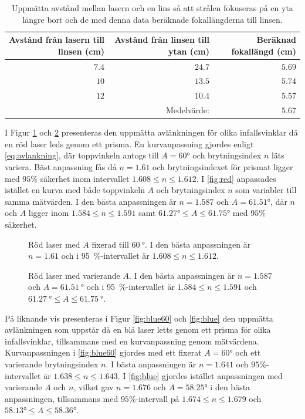 \documentclass[a4paper]{article}
\begin{document}
\begin{table}[h]
	\centering
	\caption{Uppmätta avstånd mellan lasern och en lins så att strålen fokuseras på en yta längre bort och de med denna data beräknade fokallängderna till linsen.}
	\label{tab:foc}
	\begin{tabular}{|rrr|}\hline %
		Avstånd från lasern till linsen (\si{\centi\meter}) & Avstånd från linsen till ytan (\si{\centi\meter}) & Beräknad fokallängd (\si{\centi\meter}) \\\hline
		$7.4$ & $24.7$ & $5.69$ \\
		$10$ & $13.5$ & $5.74$ \\
		$12$ & $10.4$ & $5.57$ \\\hline
		& Medelvärde: & $5.67$ \\\hline
	\end{tabular}
\end{table}

I Figur \ref{fig:red60} och \ref{fig:red} presenteras den uppmätta avlänkningen för olika infallsvinklar då en röd laser leds genom ett prisma. En kurvanpassning gjordes enligt \autoref{eq:avlankning}, där toppvinkeln antogs till $A = 60\si{\degree}$ och brytningsindex $n$ läts variera. Bäst anpassning fås då $n = 1.61$ och brytningsindexet för prismat ligger med $95\%$ säkerhet inom intervallet $1.608\le n \le1.612$. I \autoref{fig:red} anpassades istället en kurva med både toppvinkeln $A$ och brytningsindex $n$ som variabler till samma mätvärden. I den bästa anpassningen är $n = 1.587$ och $A = 61.51\si{\degree}$, där $n$ och $A$ ligger inom $1.584\le n \le1.591$ samt $61.27\si{\degree}\le A \le 61.75\si{\degree}$ med $95\%$ säkerhet.


\FloatBarrier
\begin{figure}[h]
	\centering
	
	\caption{Röd laser med $A$ fixerad till $\SI{60}{\degree}$. I den bästa anpassningen är $n=1.61$ och i \SI{95}{\percent}-intervallet är $1.608\le n \le1.612$.}
	\label{fig:red60}
\end{figure}
\begin{figure}[h]
	\centering
	
	\caption{Röd laser med varierande $A$. I den bästa anpassningen är $n=1.587$ och $A=\SI{61.51}{\degree}$ och i \SI{95}{\percent}-intervallet är $1.584\le n \le1.591$ och $\SI{61.27}{\degree}\le A \le\SI{61.75}{\degree}$.}
	\label{fig:red}
\end{figure}
\FloatBarrier

På liknande vis presenteras i Figur \ref{fig:blue60} och \ref{fig:blue} den uppmätta avlänkningen som uppstår då en blå laser letts genom ett prisma för olika infallsvinklar, tillsammans med en kurvanpassning genom mätvärdena. Kurvanpassningen i \autoref{fig:blue60} gjordes med ett fixerat $A = 60\si{\degree}$ och ett varierande brytningsindex $n$. I bästa anpassningen är $n = 1.641$ och $95\%$-intervallet är $1.638\le n \le 1.643$. I \autoref{fig:blue} gjordes istället anpassningen med varierande $A$ och $n$, vilket gav $n = 1.676$ och $A = 58.25\si{\degree}$ i den bästa anpassningen, tillsammans med $95\%$-intervall på $1.674\le n \le 1.679$ och $58.13\si{\degree}\le A \le58.36\si{\degree}$.
\end{document}
